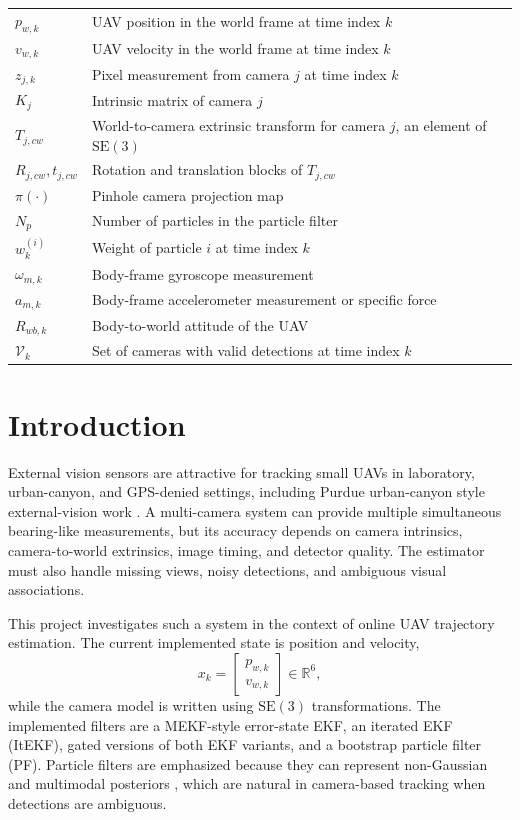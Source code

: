 \documentclass{aiaa-tc}
\newcommand{\R}{\mathbb{R}}
\newcommand{\SE}{\mathrm{SE}}
\newcommand{\V}{\mathcal{V}}
\begin{document}
\begin{tabular}{ll}
\(p_{w,k}\) & UAV position in the world frame at time index \(k\) \\
\(v_{w,k}\) & UAV velocity in the world frame at time index \(k\) \\
\(z_{j,k}\) & Pixel measurement from camera \(j\) at time index \(k\) \\
\(K_j\) & Intrinsic matrix of camera \(j\) \\
\(T_{j,cw}\) & World-to-camera extrinsic transform for camera \(j\), an element of \(\SE(3)\) \\
\(R_{j,cw},t_{j,cw}\) & Rotation and translation blocks of \(T_{j,cw}\) \\
\(\pi(\cdot)\) & Pinhole camera projection map \\
\(N_p\) & Number of particles in the particle filter \\
\(w_k^{(i)}\) & Weight of particle \(i\) at time index \(k\) \\
\(\omega_{m,k}\) & Body-frame gyroscope measurement \\
\(a_{m,k}\) & Body-frame accelerometer measurement or specific force \\
\(R_{wb,k}\) & Body-to-world attitude of the UAV \\
\(\V_k\) & Set of cameras with valid detections at time index \(k\)
\end{tabular}

\section{Introduction}

External vision sensors are attractive for tracking small UAVs in laboratory,
urban-canyon, and GPS-denied settings, including Purdue urban-canyon style
external-vision work \cite{yang2022}.  A multi-camera system can provide
multiple simultaneous bearing-like measurements, but its accuracy depends on
camera intrinsics, camera-to-world extrinsics, image timing, and detector
quality.  The estimator must also handle missing views, noisy detections, and
ambiguous visual associations.

This project investigates such a system in the context of online UAV trajectory
estimation.  The current implemented state is position and velocity,
\[
x_k =
\begin{bmatrix}
p_{w,k}\\
v_{w,k}
\end{bmatrix}
\in \R^6,
\]
while the camera model is written using \(\SE(3)\) transformations.  The
implemented filters are a MEKF-style error-state EKF, an iterated EKF (ItEKF),
gated versions of both EKF variants, and a bootstrap particle filter (PF).
Particle filters are emphasized because they can represent non-Gaussian and
multimodal posteriors \cite{thrun2005}, which are natural in camera-based
tracking when detections are ambiguous.
\end{document}
